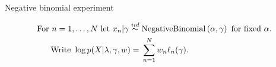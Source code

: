 \begin{frame}{Negative binomial experiment}

    \begin{align*}
    \textrm{For }n={} 1,\ldots, N \textrm{ let }
        x_n |  \gamma \overset{iid}{\sim}{}& \textrm{NegativeBinomial}\left(\alpha, \gamma \right)
        \textrm{ for fixed }\alpha.\\
    \textrm{Write }\log p(X \vert \lambda, \gamma, w) ={}&
           \sum_{n=1}^N w_n \ell_n(\gamma).
    \end{align*}
    \pause
    \LowDimAccuracyGraph{}
\end{frame}
        



